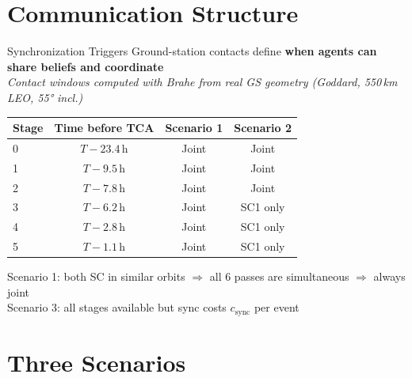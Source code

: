\documentclass[aspectratio=169]{beamer}
\newcommand{\good}[1]{\textcolor{green!60!black}{#1}}
\newcommand{\bad}[1]{\textcolor{red!70!black}{#1}}
\begin{document}
\section{Communication Structure}

\begin{frame}{Synchronization Triggers}
  Ground-station contacts define \textbf{when agents can share beliefs and coordinate}\\[0.3em]
  \small\textit{Contact windows computed with Brahe from real GS geometry (Goddard, 550\,km LEO, 55° incl.)}

  \vspace{0.5em}
  \begin{center}
  \begin{tabular}{lccc}
    \toprule
    Stage & Time before TCA & Scenario 1 & Scenario 2 \\
    \midrule
    0 & $T{-}23.4$\,h & \good{Joint} & \good{Joint} \\
    1 & $T{-}9.5$\,h  & \good{Joint} & \good{Joint} \\
    2 & $T{-}7.8$\,h  & \good{Joint} & \good{Joint} \\
    3 & $T{-}6.2$\,h  & \good{Joint} & \bad{SC1 only} \\
    4 & $T{-}2.8$\,h  & \good{Joint} & \bad{SC1 only} \\
    5 & $T{-}1.1$\,h  & \good{Joint} & \bad{SC1 only} \\
    \bottomrule
  \end{tabular}
  \end{center}
  \vspace{0.3em}
  Scenario 1: both SC in similar orbits $\Rightarrow$ all 6 passes are simultaneous $\Rightarrow$ always joint\\
  Scenario 3: all stages available but sync costs $c_\text{sync}$ per event
\end{frame}

\section{Three Scenarios}
\end{document}
